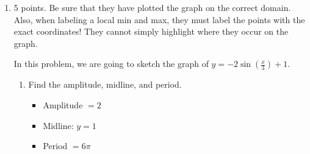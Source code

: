 \documentclass{article}
\begin{document}
\begin{enumerate}[topsep=0pt]
\begin{enumerate}

    \begin{problem}[\stretch{1}]
      Based on your graphs, how many solutions does
      $\cos(2x) = 2 \cos x$ have on the interval $[0, 2 \pi]$?
    \end{problem}

    \begin{solution}
      The graphs intersect at two places, so the equation should have
       solutions.
    \end{solution}

  \item
    \begin{problem}[\nstretch{1}]
      How many solutions does the equation $\cos(2x) = 2 \cos x$ have on
      the interval $\left[0, \frac{\pi}{2} \right]$?
    \end{problem}

    \begin{solution}
      . The graphs do not intersect on that interval.
    \end{solution}

  \end{enumerate}

\item 

\begin{grading}
5 points. Be sure that they have plotted the graph on the correct domain. Also, when labeling a local min and max, they must label the points with the exact coordinates! They cannot simply highlight where they occur on the graph. 
\end{grading}


\begin{problem}
In this problem, we are going to sketch the graph of $y=-2 \sin ( \frac{x}{3})
    + 1$.
\end{problem}

\begin{enumerate}

\item
\begin{problem}
    Find the amplitude, midline, and period.
\end{problem}

\begin{solution}
    \begin{itemize}
        \item Amplitude $=2$
        \item Midline: $y=1$
        \item Period $=6\pi$
    \end{itemize}
\end{solution}


\end{enumerate}
\end{enumerate}
\end{document}
